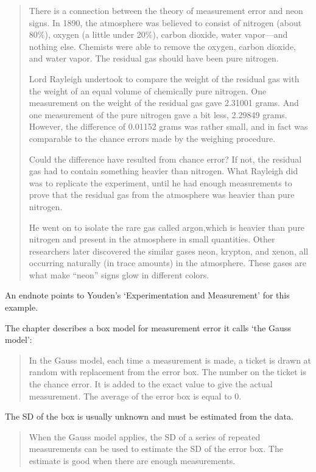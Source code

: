 \documentclass[
]{book}
\begin{document}
\begin{quote}
There is a connection between the theory of measurement error and neon signs. In 1890, the atmosphere was believed to consist of nitrogen (about 80\%), oxygen (a little under 20\%), carbon dioxide, water vapor---and nothing else. Chemists were able to remove the oxygen, carbon dioxide, and water vapor. The residual gas should have been pure nitrogen.

Lord Rayleigh undertook to compare the weight of the residual gas with the weight of an equal volume of chemically pure nitrogen. One measurement on the weight of the residual gas gave 2.31001 grams. And one measurement of the pure nitrogen gave a bit less, 2.29849 grams. However, the difference of 0.01152 grams was rather small, and in fact was comparable to the chance errors made by the weighing procedure.

Could the difference have resulted from chance error? If not, the residual gas had to contain something heavier than nitrogen. What Rayleigh did was to replicate the experiment, until he had enough measurements to prove that the residual gas from the atmosphere was heavier than pure nitrogen.

He went on to isolate the rare gas called argon,which is heavier than pure nitrogen and present in the atmosphere in small quantities. Other researchers later discovered the similar gases neon, krypton, and xenon, all occurring naturally (in trace amounts) in the atmosphere. These gases are what make ``neon'' signs glow in different colors.
\end{quote}

An endnote points to Youden's `Experimentation and Measurement' for this example.

The chapter describes a box model for measurement error it calls `the Gauss model':

\begin{quote}
In the Gauss model, each time a measurement is made, a ticket is drawn at random with replacement from the error box. The number on the ticket is the chance error. It is added to the exact value to give the actual measurement. The average of the error box is equal to 0.
\end{quote}

The SD of the box is usually unknown and must be estimated from the data.

\begin{quote}
When the Gauss model applies, the SD of a series of repeated measurements can be used to estimate the SD of the error box. The estimate is good when there are enough measurements.
\end{quote}
\end{document}
